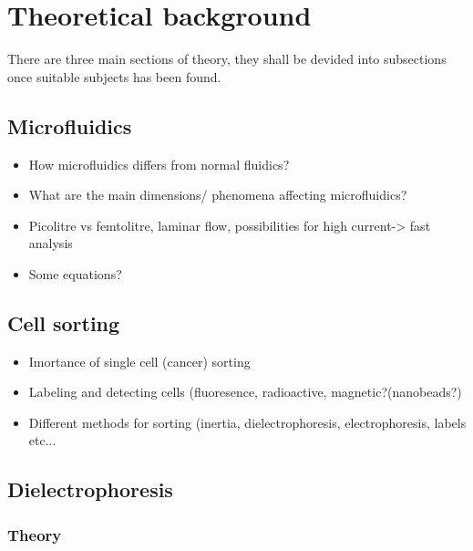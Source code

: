 \documentclass[draft]{jyflluk}
\begin{document}
\section{Theoretical background}
\label{sec:theoretical_background}

There are three main sections of theory, they shall be devided into subsections once suitable subjects has been found.

\subsection{Microfluidics}
\label{sec:subsection1}
\begin{itemize}
    \item  How microfluidics differs from normal fluidics?
    \item  What are the main dimensions/ phenomena affecting microfluidics? 
    \item  Picolitre vs femtolitre, laminar flow, possibilities for high current-> fast analysis
    \item  Some equations? 
\end{itemize}




\subsection{Cell sorting}
\label{sec:x2}
 \begin{itemize}
     \item Imortance of single cell (cancer) sorting
     \item Labeling and detecting cells (fluoresence, radioactive, magnetic?(nanobeads?)
     \item Different methods for sorting (inertia, dielectrophoresis, electrophoresis, labels etc...
 \end{itemize}

\newpage
\subsection{Dielectrophoresis}
\label{sec:x3}
\subsubsection{Theory}
\label{sex:x3.1}
\end{document}
